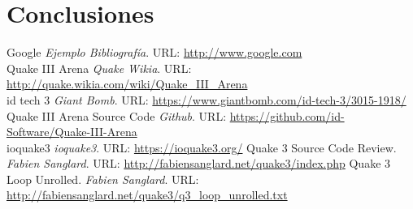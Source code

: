 \documentclass[a4paper,12pt]{report}
\begin{document}
	\section{Conclusiones}
			
	
	
	
	\begin{appendices}
	
	\end{appendices}
	
	\begin{thebibliography}{9}
		
		Google \emph{Ejemplo Bibliografía}. URL: \url{http://www.google.com}\\
		Quake III Arena \emph{Quake Wikia}. URL: \url{http://quake.wikia.com/wiki/Quake_III_Arena}\\
		 id tech 3 \emph{Giant Bomb}. URL: \url{https://www.giantbomb.com/id-tech-3/3015-1918/}\\
		 Quake III Arena Source Code \emph{Github}. URL: \url{https://github.com/id-Software/Quake-III-Arena}\\
		 ioquake3 \emph{ioquake3}. URL: \url{https://ioquake3.org/}
		 Quake 3 Source Code Review. \emph{Fabien Sanglard}. URL: \url{http://fabiensanglard.net/quake3/index.php}
         Quake 3 Loop Unrolled. \emph{Fabien Sanglard}. URL: \url{http://fabiensanglard.net/quake3/q3_loop_unrolled.txt}
		
	\end{thebibliography}


	
	
\end{document}
